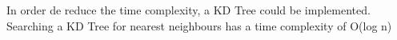 
\begin{DoxyRefList}
\item[\label{todo__todo000001}%
\Hypertarget{todo__todo000001}%
Class \hyperlink{classDataTools_1_1classification_1_1KnearestClassification}{Knearest\+Classification} ]In order de reduce the time complexity, a KD Tree could be implemented. Searching a KD Tree for nearest neighbours has a time complexity of {\ttfamily O(log n)} 
\end{DoxyRefList}